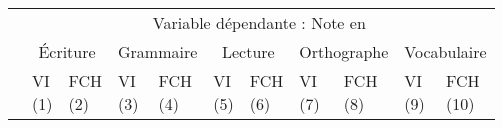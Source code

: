 \documentclass[
]{book}
\begin{document}
\begin{ThreePartTable}
\begin{longtable}[t]{lllllllllll}
\toprule
\multicolumn{1}{c}{} & \multicolumn{10}{c}{Variable dépendante : Note en } \\
\cmidrule(l{3pt}r{3pt}){2-11}
\multicolumn{1}{c}{} & \multicolumn{2}{c}{Écriture} & \multicolumn{2}{c}{Grammaire} & \multicolumn{2}{c}{Lecture} & \multicolumn{2}{c}{Orthographe} & \multicolumn{2}{c}{Vocabulaire} \\
\cmidrule(l{3pt}r{3pt}){2-3} \cmidrule(l{3pt}r{3pt}){4-5} \cmidrule(l{3pt}r{3pt}){6-7} \cmidrule(l{3pt}r{3pt}){8-9} \cmidrule(l{3pt}r{3pt}){10-11}
 & \makecell{VI \\ (1) } & \makecell{FCH \\ (2) } & \makecell{VI \\ (3) } & \makecell{FCH \\ (4) } & \makecell{VI \\ (5) } & \makecell{FCH \\ (6) } & \makecell{VI \\ (7) } & \makecell{FCH \\ (8) } & \makecell{VI \\ (9) } & \makecell{FCH \\ (10) }\\
\midrule
\endhead


\end{longtable}
\end{ThreePartTable}
\end{document}
